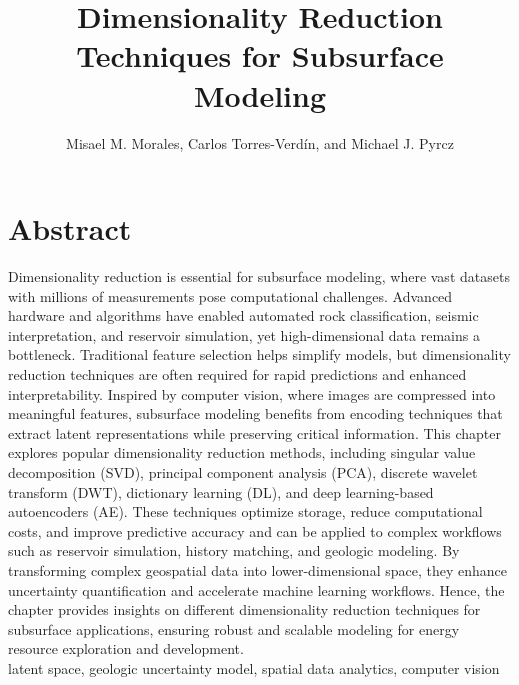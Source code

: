 \documentclass[a4paper,fleqn,12pt]{article}
\title{Dimensionality Reduction Techniques for Subsurface Modeling}
\author{Misael M. Morales, Carlos Torres-Verd\'{i}n, and Michael J. Pyrcz}
\begin{document}
\newcommand*{\vertbar}{\rule[-1ex]{0.5pt}{2.5ex}}
\maketitle
\linenumbers

\section*{Abstract}
Dimensionality reduction is essential for subsurface modeling, where vast datasets with millions of measurements pose computational challenges. Advanced hardware and algorithms have enabled automated rock classification, seismic interpretation, and reservoir simulation, yet high-dimensional data remains a bottleneck. Traditional feature selection helps simplify models, but dimensionality reduction techniques are often required for rapid predictions and enhanced interpretability. Inspired by computer vision, where images are compressed into meaningful features, subsurface modeling benefits from encoding techniques that extract latent representations while preserving critical information. This chapter explores popular dimensionality reduction methods, including singular value decomposition (SVD), principal component analysis (PCA), discrete wavelet transform (DWT), dictionary learning (DL), and deep learning-based autoencoders (AE). These techniques optimize storage, reduce computational costs, and improve predictive accuracy and can be applied to complex workflows such as reservoir simulation, history matching, and geologic modeling. By transforming complex geospatial data into lower-dimensional space, they enhance uncertainty quantification and accelerate machine learning workflows. Hence, the chapter provides insights on different dimensionality reduction techniques for subsurface applications, ensuring robust and scalable modeling for energy resource exploration and development.\\

 latent space, geologic uncertainty model, spatial data analytics, computer vision

\end{document}
